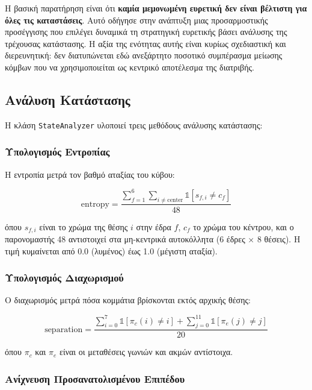 Η βασική παρατήρηση είναι ότι \textbf{καμία μεμονωμένη ευρετική δεν είναι
βέλτιστη για όλες τις καταστάσεις}. Αυτό οδήγησε στην ανάπτυξη μιας
προσαρμοστικής προσέγγισης που επιλέγει δυναμικά τη στρατηγική ευρετικής βάσει
ανάλυσης της τρέχουσας κατάστασης. Η αξία της ενότητας αυτής είναι κυρίως
σχεδιαστική και διερευνητική: δεν διατυπώνεται εδώ ανεξάρτητο ποσοτικό
συμπέρασμα μείωσης κόμβων που να χρησιμοποιείται ως κεντρικό αποτέλεσμα της
διατριβής.

\subsection{Ανάλυση Κατάστασης}
\label{subsec:state-analysis}

Η κλάση \texttt{StateAnalyzer} υλοποιεί τρεις μεθόδους ανάλυσης κατάστασης:

\subsubsection{Υπολογισμός Εντροπίας}

Η εντροπία μετρά τον βαθμό αταξίας του κύβου:

\begin{equation}
\label{eq:entropy}
\text{entropy} = \frac{\sum_{f=1}^{6} \sum_{i \neq \text{center}} \mathbb{1}[s_{f,i} \neq c_f]}{48}
\end{equation}

όπου $s_{f,i}$ είναι το χρώμα της θέσης $i$ στην έδρα $f$, $c_f$ το χρώμα του κέντρου, και ο παρονομαστής 48 αντιστοιχεί στα μη-κεντρικά αυτοκόλλητα (6 έδρες × 8 θέσεις). Η τιμή κυμαίνεται από 0.0 (λυμένος) έως 1.0 (μέγιστη αταξία).

\subsubsection{Υπολογισμός Διαχωρισμού}

Ο διαχωρισμός μετρά πόσα κομμάτια βρίσκονται εκτός αρχικής θέσης:

\begin{equation}
\label{eq:separation}
\text{separation} = \frac{\sum_{i=0}^{7} \mathbb{1}[\pi_c(i) \neq i] + \sum_{j=0}^{11} \mathbb{1}[\pi_e(j) \neq j]}{20}
\end{equation}

όπου $\pi_c$ και $\pi_e$ είναι οι μεταθέσεις γωνιών και ακμών αντίστοιχα.

\subsubsection{Ανίχνευση Προσανατολισμένου Επιπέδου}


